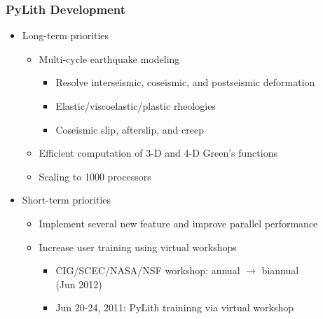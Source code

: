 \documentclass{beamer}
\begin{document}
\begin{frame}
  \frametitle{PyLith Development}
  \summary{}

  \begin{itemize}
  \item Long-term priorities
    \begin{itemize}
    \item Multi-cycle earthquake modeling
      \begin{itemize}
      \item Resolve interseismic, coseismic, and postseismic deformation
      \item Elastic/viscoelastic/plastic rheologies
      \item Coseismic slip, afterslip, and creep
      \end{itemize}
   \item Efficient computation of 3-D and 4-D Green's functions
    \item Scaling to 1000 processors
   \end{itemize}
  \item Short-term priorities
    \begin{itemize}
    \item Implement several new feature and improve parallel
      performance
    \item Increase user training using virtual workshops
    \begin{itemize}
      \item CIG/SCEC/NASA/NSF workshop: annual $\rightarrow$ biannual\\
        (Jun 2012)
      \item Jun 20-24, 2011: PyLith traininng via virtual workshop
      \end{itemize}
    \end{itemize}
  \end{itemize}

\end{frame}
\end{document}
